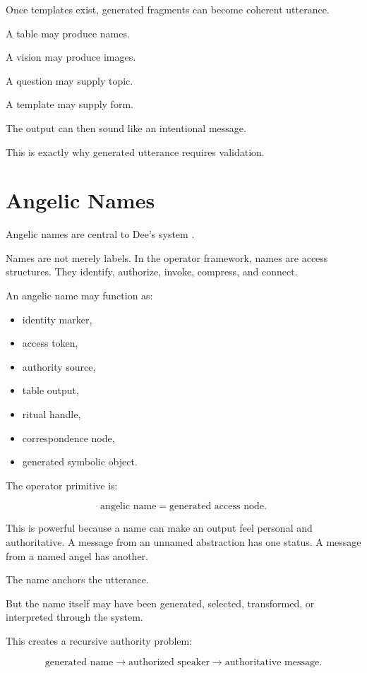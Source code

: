 \documentclass[11pt]{book}
\begin{document}
Once templates exist, generated fragments can become coherent utterance.

A table may produce names.

A vision may produce images.

A question may supply topic.

A template may supply form.

The output can then sound like an intentional message.

This is exactly why generated utterance requires validation.

\section{Angelic Names}

Angelic names are central to Dee’s system \cite{DeeCasaubon1659TrueFaithfulRelation,Yates1964GiordanoBruno}.

Names are not merely labels. In the operator framework, names are access structures. They identify, authorize, invoke, compress, and connect.

An angelic name may function as:

\begin{itemize}
    \item identity marker,
    \item access token,
    \item authority source,
    \item table output,
    \item ritual handle,
    \item correspondence node,
    \item generated symbolic object.
\end{itemize}

The operator primitive is:

\[
\text{angelic name} = \text{generated access node}.
\]

This is powerful because a name can make an output feel personal and authoritative. A message from an unnamed abstraction has one status. A message from a named angel has another.

The name anchors the utterance.

But the name itself may have been generated, selected, transformed, or interpreted through the system.

This creates a recursive authority problem:

\[
\text{generated name}
\rightarrow
\text{authorized speaker}
\rightarrow
\text{authoritative message}.
\]
\end{document}
